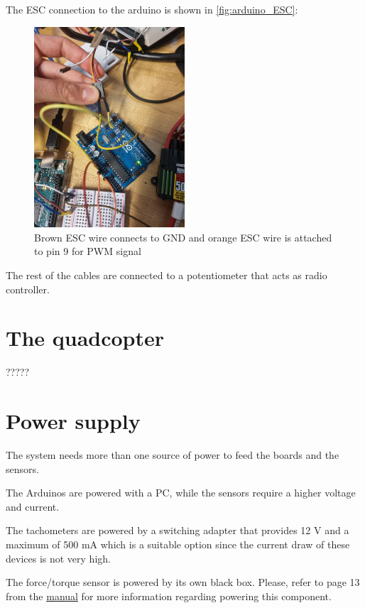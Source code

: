 \documentclass[a4paper]{article}
\begin{document}
{The ESC connection to the arduino is shown in \autoref{fig:arduino_ESC}:

\begin{figure}[h!]
	\centering
	\includegraphics[width=0.5\textwidth]{arduino_ESC.jpeg}
	\caption{Brown ESC wire connects to GND and orange ESC wire is attached to pin 9 for PWM signal}
	\label{fig:arduino_ESC}
\end{figure}

The rest of the cables are connected to a potentiometer that acts as radio controller.




\section{The quadcopter}
?????

\section{Power supply}

The system needs more than one source of power to feed the boards and the sensors. 

The Arduinos are powered with a PC, while the sensors require a higher voltage and current.

The tachometers are powered by a switching adapter that provides 12 V and a maximum of 500 mA which is a suitable option since the current draw of these devices is not very high.

The force/torque sensor is powered by its own black box. Please, refer to page 13 from the \hyperref{https://www.ati-ia.com/app_content/documents/9620-05-DAQ.pdf}{category}{name}{manual} for more information regarding powering this component.

}
\end{document}
